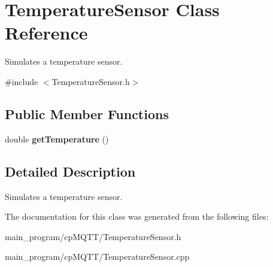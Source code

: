 \hypertarget{class_temperature_sensor}{}\section{Temperature\+Sensor Class Reference}
\label{class_temperature_sensor}


Simulates a temperature sensor.  




{\ttfamily \#include $<$Temperature\+Sensor.\+h$>$}

\subsection*{Public Member Functions}
\begin{DoxyCompactItemize}
\item 
double {\bfseries get\+Temperature} ()\hypertarget{class_temperature_sensor_a38175d6f8b8d77311e1ebdceb6c420f0}{}\label{class_temperature_sensor_a38175d6f8b8d77311e1ebdceb6c420f0}

\end{DoxyCompactItemize}


\subsection{Detailed Description}
Simulates a temperature sensor. 

The documentation for this class was generated from the following files\+:\begin{DoxyCompactItemize}
\item 
main\+\_\+program/cp\+M\+Q\+T\+T/Temperature\+Sensor.\+h\item 
main\+\_\+program/cp\+M\+Q\+T\+T/Temperature\+Sensor.\+cpp\end{DoxyCompactItemize}
